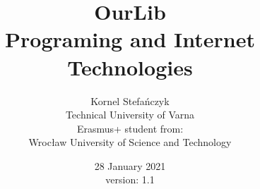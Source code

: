 


\title{OurLib\\ \large{Programing and Internet Technologies}}
\author{Kornel Stefańczyk 
\\Technical University of Varna
\\ Erasmus+ student from: 
\\ Wrocław University of Science and Technology}
\date{28 January 2021 \\version: 1.1}



\maketitle
\newpage


% 
% 


% 
% 



